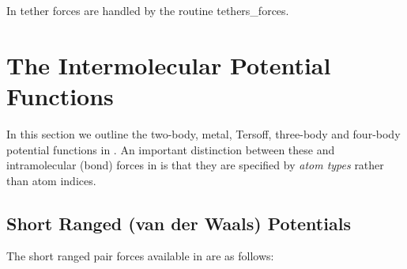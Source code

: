 In \D tether forces are handled by the routine {\sc tethers\_forces}.

\section{The Intermolecular Potential Functions}

In this section we outline the two-body,
metal, Tersoff,
three-body and
four-body potential functions in \D.
An important distinction between these and
intramolecular (bond) forces in \D is
that they are specified by {\em atom types} rather than atom indices.

\subsection{Short Ranged (van der Waals) Potentials}
\label{vdw}

The short ranged pair forces available in \D are as
follows:


